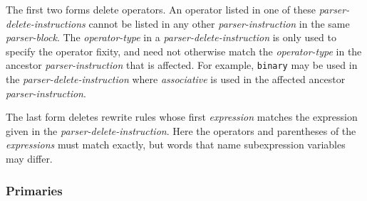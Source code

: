 \documentclass[12pt]{article}
\begin{document}
The first two forms delete operators.
An operator listed in one of these
{\em parser-delete-instructions} cannot be listed in
any other {\em parser-instruction} in the same {\em parser-block}.
The {\em operator-type} in a
{\em parser-delete-instruction} is only used to specify
the operator fixity, and need not otherwise match the {\em operator-type}
in the ancestor {\em parser-instruction} that is affected.
For example, {\tt binary} may be used in the {\em parser-delete-instruction}
where {\em associative} is used in the affected ancestor
{\em parser-instruction}.

The last form deletes rewrite rules whose first {\em expression}
matches the expression given in the {\em parser-delete-instruction}.
Here the operators and parentheses of the {\em expressions} must match
exactly, but words that name subexpression variables may differ.

\subsubsection{Primaries}
\label{PRIMARIES}
\end{document}
